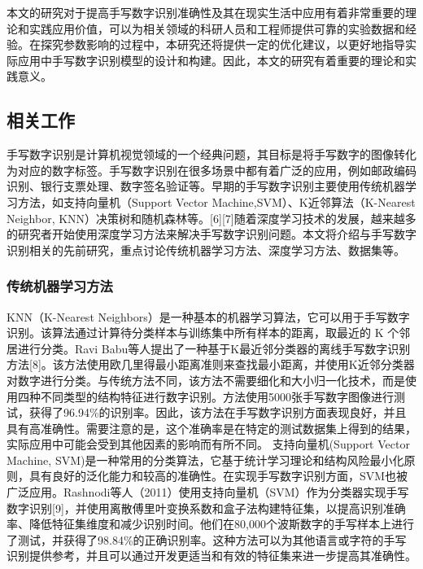 \documentclass[11pt]{article}
\begin{document}
本文的研究对于提高手写数字识别准确性及其在现实生活中应用有着非常重要的理论和实践应用价值，可以为相关领域的科研人员和工程师提供可靠的实验数据和经验。在探究参数影响的过程中，本研究还将提供一定的优化建议，以更好地指导实际应用中手写数字识别模型的设计和构建。因此，本文的研究有着重要的理论和实践意义。
\subsection{相关工作}
\label{sec:orgcb0be2c}
手写数字识别是计算机视觉领域的一个经典问题，其目标是将手写数字的图像转化为对应的数字标签。手写数字识别在很多场景中都有着广泛的应用，例如邮政编码识别、银行支票处理、数字签名验证等。早期的手写数字识别主要使用传统机器学习方法，如支持向量机（Support Vector Machine,SVM）、K近邻算法（K-Nearest Neighbor, KNN）决策树和随机森林等。[6][7]随着深度学习技术的发展，越来越多的研究者开始使用深度学习方法来解决手写数字识别问题。本文将介绍与手写数字识别相关的先前研究，重点讨论传统机器学习方法、深度学习方法、数据集等。
\subsubsection{传统机器学习方法}
\label{sec:org0f4a2ec}
KNN（K-Nearest Neighbors）是一种基本的机器学习算法，它可以用于手写数字识别。该算法通过计算待分类样本与训练集中所有样本的距离，取最近的 K 个邻居进行分类。Ravi Babu等人提出了一种基于K最近邻分类器的离线手写数字识别方法[8]。该方法使用欧几里得最小距离准则来查找最小距离，并使用K近邻分类器对数字进行分类。与传统方法不同，该方法不需要细化和大小归一化技术，而是使用四种不同类型的结构特征进行数字识别。方法使用5000张手写数字图像进行测试，获得了96.94\%的识别率。因此，该方法在手写数字识别方面表现良好，并且具有高准确性。需要注意的是，这个准确率是在特定的测试数据集上得到的结果，实际应用中可能会受到其他因素的影响而有所不同。
支持向量机(Support Vector Machine, SVM)是一种常用的分类算法，它基于统计学习理论和结构风险最小化原则，具有良好的泛化能力和较高的准确性。在实现手写数字识别方面，SVM也被广泛应用。Rashnodi等人（2011）使用支持向量机（SVM）作为分类器实现手写数字识别[9]，并使用离散傅里叶变换系数和盒子法构建特征集，以提高识别准确率、降低特征集维度和减少识别时间。他们在80,000个波斯数字的手写样本上进行了测试，并获得了98.84\%的正确识别率。这种方法可以为其他语言或字符的手写识别提供参考，并且可以通过开发更适当和有效的特征集来进一步提高其准确性。
\end{document}
